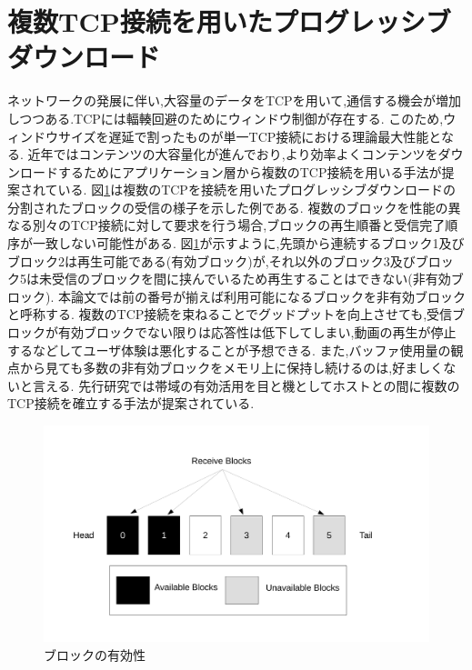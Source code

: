 \documentclass[a4j,12pt]{gradthesis_utf8}
\begin{document}
\clearpage

\section{複数TCP接続を用いたプログレッシブダウンロード}
\label{hukusu}
ネットワークの発展に伴い,大容量のデータをTCPを用いて,通信する機会が増加しつつある.TCPには輻輳回避のためにウィンドウ制御が存在する.
このため,ウィンドウサイズを遅延で割ったものが単一TCP接続における理論最大性能となる.
近年ではコンテンツの大容量化が進んでおり,より効率よくコンテンツをダウンロードするためにアプリケーション層から複数のTCP接続を用いる手法が提案されている.
図\ref{block}は複数のTCPを接続を用いたプログレッシブダウンロードの分割されたブロックの受信の様子を示した例である.
複数のブロックを性能の異なる別々のTCP接続に対して要求を行う場合,ブロックの再生順番と受信完了順序が一致しない可能性がある.
図\ref{block}が示すように,先頭から連続するブロック1及びブロック2は再生可能である(有効ブロック)が,それ以外のブロック3及びブロック5は未受信のブロックを間に挟んでいるため再生することはできない(非有効ブロック).
本論文では前の番号が揃えば利用可能になるブロックを非有効ブロックと呼称する.
複数のTCP接続を束ねることでグッドプットを向上させても,受信ブロックが有効ブロックでない限りは応答性は低下してしまい,動画の再生が停止するなどしてユーザ体験は悪化することが予想できる.
また,バッファ使用量の観点から見ても多数の非有効ブロックをメモリ上に保持し続けるのは,好ましくないと言える.
先行研究では帯域の有効活用を目と機としてホストとの間に複数のTCP接続を確立する手法が提案されている\cite{hiraoka}.

\begin{figure}[h]
	\centering
	\includegraphics[width=18.5cm]{figure/block.pdf}
	\caption{ブロックの有効性}
	\label{block}
\end{figure}

\clearpage
\end{document}
